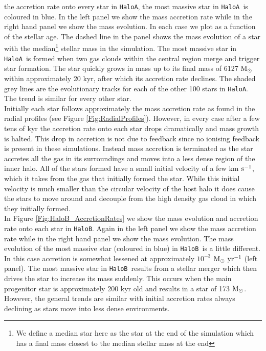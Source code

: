 \documentclass[twocolumn,iop,revtex4]{openjournal}
\newcommand{\kms} {km $\rm{s^{-1}}$}
\newcommand{\msolar} {$\rm{M_{\odot}}~$}
\newcommand{\msolarc} {$\rm{M_{\odot}}$}
\newcommand{\msolaryr} {$\rm{M_{\odot}~yr^{-1}}~$}
\newcommand{\ha} {\texttt{HaloA~}}
\newcommand{\hb} {\texttt{HaloB~}}
\newcommand{\hac} {\texttt{HaloA}}
\newcommand{\hbc} {\texttt{HaloB}}
\begin{document}
the accretion rate onto every star in \hac, the most massive star in \ha is coloured in blue.
In the left panel we show the mass accretion rate while in the right hand panel we show the mass evolution.
In each case we plot as a function of the stellar age. The dashed line in the panel shows the mass evolution
of a star with the median\footnote{We define a
        median star here as the star at the end of the simulation which has a final mass
        closest to the median stellar mass at the end} stellar mass in the simulation.
The most massive star in \ha is formed
when two gas clouds within the central region merge and trigger star formation. The star quickly
grows in mass up to its final mass of 6127 \msolar within approximately 20 kyr, after which
its accretion rate declines. The shaded grey lines are the evolutionary tracks for each of the
other 100 stars in \hac. The trend is similar for every other star.\\
\indent Initially each star follows approximately the mass accretion rate as found in the radial profiles (see Figure \ref{Fig:RadialProfiles}).
However, in every case after a few tens of kyr the accretion rate onto each star drops dramatically and mass growth is halted.
This drop in accretion is not due to feedback since no ionising feedback
is present in these simulations. Instead mass accretion is terminated as the star accretes all the gas in
its surroundings and moves into a less dense region of the inner halo. All of the stars formed have a small initial velocity of a few \kms,
which it takes from the gas that initially formed the star. While this 
initial velocity is much smaller than the circular
velocity of the host halo it does cause the stars to move around and decouple from the high density gas cloud in which they initially formed. \\
\indent In Figure \ref{Fig:HaloB_AccretionRates} we show the mass evolution and accretion rate onto each star in \hbc.
  Again in the left panel we show the mass accretion rate while in the right hand panel we show the mass evolution.
  The mass evolution of the most massive star (coloured in blue) in \hb is a little different. In this case accretion is somewhat lessened
  at approximately $10^{-3}$ \msolaryr (left panel). The most
  massive star in \hb results from a stellar merger which then drives the star to increase its mass suddenly. This occurs
  when the main progenitor star is approximately 200 kyr old and results in a star of 173 \msolarc. However, the general
trends are similar with initial accretion rates always declining as stars move into less dense environments.\\
\end{document}
